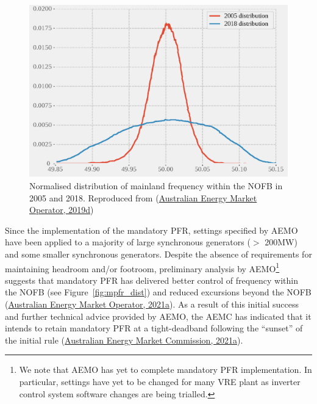 \documentclass[12pt,a4paper,]{report}
\begin{document}
\begin{figure}
\hypertarget{fig:nofb_freq_2005_2018}{%
\centering
\includegraphics{source/figures/nem_nofb_frequency_2005_2018_digitised.eps}
\caption[NEM mainland frequency distributions, 2005 and 2018]{Normalised
distribution of mainland frequency within the NOFB in 2005 and 2018.
Reproduced from
(\protect\hyperlink{ref-australianenergymarketoperatorElectricityRuleChange2019a}{Australian
Energy Market Operator, 2019d})}\label{fig:nofb_freq_2005_2018}
}
\end{figure}

Since the implementation of the mandatory PFR, settings specified by
AEMO have been applied to a majority of large synchronous generators
(\(>\) 200MW) and some smaller synchronous generators. Despite the
absence of requirements for maintaining headroom and/or footroom,
preliminary analysis by AEMO\footnote{We note that AEMO has yet to
  complete mandatory PFR implementation. In particular, settings have
  yet to be changed for many VRE plant as inverter control system
  software changes are being trialled.} suggests that mandatory PFR has
delivered better control of frequency within the NOFB (see
Figure~\ref{fig:mpfr_dist}) and reduced excursions beyond the NOFB
(\protect\hyperlink{ref-australianenergymarketoperatorEnduringPrimaryFrequency2021}{Australian
Energy Market Operator, 2021a}). As a result of this initial success and
further technical advice provided by AEMO, the AEMC has indicated that
it intends to retain mandatory PFR at a tight-deadband following the
``sunset'' of the initial rule
(\protect\hyperlink{ref-australianenergymarketcommissionPrimaryFrequencyResponse2021}{Australian
Energy Market Commission, 2021a}).
\end{document}
